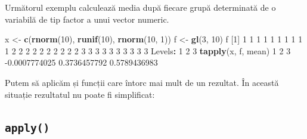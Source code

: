 \documentclass[]{article}
\newenvironment{Shaded}{\begin{snugshade}}{\end{snugshade}}
\newcommand{\DataTypeTok}[1]{\textcolor[rgb]{0.13,0.29,0.53}{#1}}
\newcommand{\DecValTok}[1]{\textcolor[rgb]{0.00,0.00,0.81}{#1}}
\newcommand{\FloatTok}[1]{\textcolor[rgb]{0.00,0.00,0.81}{#1}}
\newcommand{\KeywordTok}[1]{\textcolor[rgb]{0.13,0.29,0.53}{\textbf{#1}}}
\newcommand{\NormalTok}[1]{#1}
\newcommand{\OperatorTok}[1]{\textcolor[rgb]{0.81,0.36,0.00}{\textbf{#1}}}
\newcommand{\StringTok}[1]{\textcolor[rgb]{0.31,0.60,0.02}{#1}}
\newcounter{exo}[section]
\begin{document}
Următorul exemplu calculează media după fiecare grupă determinată de o
variabilă de tip factor a unui vector numeric.

\begin{Shaded}
\begin{Highlighting}[]
\NormalTok{x <-}\StringTok{ }\KeywordTok{c}\NormalTok{(}\KeywordTok{rnorm}\NormalTok{(}\DecValTok{10}\NormalTok{), }\KeywordTok{runif}\NormalTok{(}\DecValTok{10}\NormalTok{), }\KeywordTok{rnorm}\NormalTok{(}\DecValTok{10}\NormalTok{, }\DecValTok{1}\NormalTok{))}
\NormalTok{f <-}\StringTok{ }\KeywordTok{gl}\NormalTok{(}\DecValTok{3}\NormalTok{, }\DecValTok{10}\NormalTok{)   }
\NormalTok{f}
\NormalTok{ [}\DecValTok{1}\NormalTok{] }\DecValTok{1} \DecValTok{1} \DecValTok{1} \DecValTok{1} \DecValTok{1} \DecValTok{1} \DecValTok{1} \DecValTok{1} \DecValTok{1} \DecValTok{1} \DecValTok{2} \DecValTok{2} \DecValTok{2} \DecValTok{2} \DecValTok{2} \DecValTok{2} \DecValTok{2} \DecValTok{2} \DecValTok{2} \DecValTok{2} \DecValTok{3} \DecValTok{3} \DecValTok{3} \DecValTok{3} \DecValTok{3} \DecValTok{3} \DecValTok{3} \DecValTok{3} \DecValTok{3} \DecValTok{3}
\NormalTok{Levels}\OperatorTok{:}\StringTok{ }\DecValTok{1} \DecValTok{2} \DecValTok{3}
\KeywordTok{tapply}\NormalTok{(x, f, mean)}
            \DecValTok{1}             \DecValTok{2}             \DecValTok{3} 
\FloatTok{-0.0007774025}  \FloatTok{0.3736457792}  \FloatTok{0.5789436983} 
\end{Highlighting}
\end{Shaded}

Putem să aplicăm și funcții care întorc mai mult de un rezultat. În
această situație rezultatul nu poate fi simplificat:

\begin{Shaded}
\end{Shaded}

\hypertarget{apply}{%
\subsection{\texorpdfstring{\texttt{apply()}}{apply()}}\label{apply}}
\end{document}
